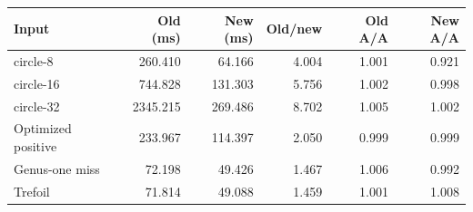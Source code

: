 \begin{tabular}{lrrrrr}
\toprule
Input & Old (ms) & New (ms) & Old/new & Old A/A & New A/A \\
\midrule
circle-8 & 260.410 & 64.166 & 4.004 & 1.001 & 0.921 \\
circle-16 & 744.828 & 131.303 & 5.756 & 1.002 & 0.998 \\
circle-32 & 2345.215 & 269.486 & 8.702 & 1.005 & 1.002 \\
Optimized positive & 233.967 & 114.397 & 2.050 & 0.999 & 0.999 \\
Genus-one miss & 72.198 & 49.426 & 1.467 & 1.006 & 0.992 \\
Trefoil & 71.814 & 49.088 & 1.459 & 1.001 & 1.008 \\
\bottomrule
\end{tabular}
